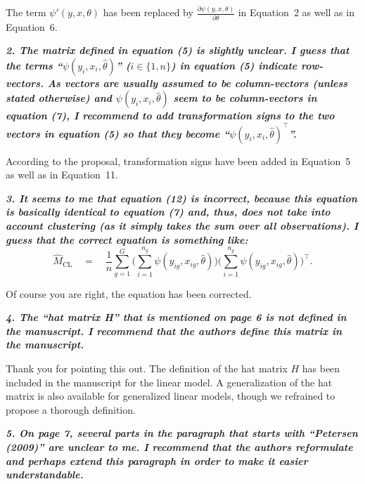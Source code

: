 \documentclass[10pt,a4paper]{article}
\begin{document}
The term $\psi'(y, x, \theta)$ has been replaced by $\frac{\partial \psi(y, x, \theta)}{\partial\theta}$ in Equation~2 as well as in Equation~6.

\medskip

\textbf{\textit{2. The matrix defined in equation (5) is slightly unclear. I guess that the terms ``$\psi(y_i, x_i, \hat\theta)$'' ($i \in \{1, n\}$) in equation (5) indicate row-vectors. As vectors are usually assumed to be column-vectors (unless stated otherwise) and $\psi(y_i, x_i, \hat\theta)$ seem to be column-vectors in
equation (7), I recommend to add transformation signs to the two vectors in equation (5)
so that they become ``$\psi(y_i, x_i, \hat\theta)^\top$''.}}

\medskip

According to the proposal, transformation signs have been added in Equation~5 as well as in Equation~11. 

\medskip

\textbf{\textit{3. It seems to me that equation (12) is incorrect, because this equation is basically identical
to equation (7) and, thus, does not take into account clustering (as it simply takes the
sum over all observations). I guess that the correct equation is something like:
\begin{equation}
  \hat M_\mathrm{CL} \quad = \quad \frac{1}{n} \sum_{g = 1}^G\bigg(\sum_{i = 1}^{n_{g}}\psi(y_{ig}, x_{ig}, \hat \theta) \bigg) \bigg(\sum_{i = 1}^{n_{g}} \psi(y_{ig}, x_{ig}, \hat \theta) \bigg)^\top.
\end{equation}}}

\medskip

Of course you are right, the equation has been corrected. 

\medskip

\textbf{\textit{4. The ``hat matrix H'' that is mentioned on page 6 is not defined in the manuscript. I
recommend that the authors define this matrix in the manuscript.}}

\medskip

Thank you for pointing this out. The definition of the hat matrix $H$ has been included in the manuscript for the linear model.
A generalization of the hat matrix is also available for generalized linear models, though we refrained to propose a thorough definition.

\medskip

\textbf{\textit{5. On page 7, several parts in the paragraph that starts with ``Petersen (2009)'' are unclear
to me. I recommend that the authors reformulate and perhaps extend this paragraph in
order to make it easier understandable.}}
\end{document}
